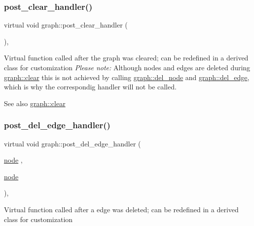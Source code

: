 \subsubsection{\texorpdfstring{post\+\_\+clear\+\_\+handler()}{post\_clear\_handler()}}
{\footnotesize\ttfamily virtual void graph\+::post\+\_\+clear\+\_\+handler (\begin{DoxyParamCaption}{ }\end{DoxyParamCaption})\hspace{0.3cm}{\ttfamily [inline]}, {\ttfamily [virtual]}}

Virtual function called after the graph was cleared; can be redefined in a derived class for customization {\itshape Please note\+:} Although nodes and edges are deleted during \mbox{\hyperlink{classgraph_a9ff5d6af3653e79f87b836701453f55a}{graph\+::clear}} this is not achieved by calling \mbox{\hyperlink{classgraph_a8bdc09d5b9ac4bd26586b054d8fcbe91}{graph\+::del\+\_\+node}} and \mbox{\hyperlink{classgraph_ad9356508c49c542dfd4b7169297387c6}{graph\+::del\+\_\+edge}}, which is why the correspondig handler will not be called.

\begin{DoxySeeAlso}{See also}
\mbox{\hyperlink{classgraph_a9ff5d6af3653e79f87b836701453f55a}{graph\+::clear}} 
\end{DoxySeeAlso}
\mbox{\label{classgraph_ab9ac8bcc7288986de69cd467beb33600}} 
\subsubsection{\texorpdfstring{post\+\_\+del\+\_\+edge\+\_\+handler()}{post\_del\_edge\_handler()}}
{\footnotesize\ttfamily virtual void graph\+::post\+\_\+del\+\_\+edge\+\_\+handler (\begin{DoxyParamCaption}\item[{\mbox{\hyperlink{classnode}{node}}}]{,  }\item[{\mbox{\hyperlink{classnode}{node}}}]{ }\end{DoxyParamCaption})\hspace{0.3cm}{\ttfamily [inline]}, {\ttfamily [virtual]}}

Virtual function called after a edge was deleted; can be redefined in a derived class for customization


